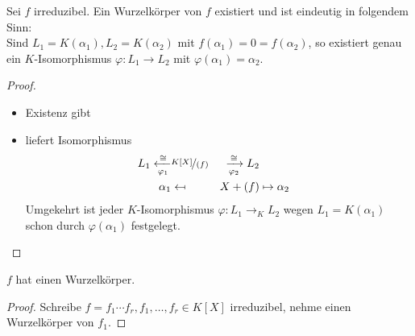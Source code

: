 \begin{proposition}
	Sei $f$ irreduzibel. Ein Wurzelkörper von $f$ existiert und ist eindeutig in folgendem Sinn:\\
	Sind $L_1 = K(\alpha_1), L_2 = K(\alpha_2)$ mit $f(\alpha_1) = 0 = f(\alpha_2)$, so existiert genau ein $K$-Isomorphismus $\varphi: L_1 \to L_2$ mit $\varphi(\alpha_1) = \alpha_2$.
\end{proposition}
\begin{proof}
	\begin{itemize}
		\item Existenz gibt 
		\item {} liefert Isomorphismus
		\begin{align*}
			L_1 \xleftarrow[\varphi_1]{\cong} & \lnkset{K[X]}{(f)} & \xrightarrow[\varphi_2]{\cong} L_2\\
			\alpha_1 & \mapsfrom 
			& X + (f) & \mapsto \alpha_2\\
		\end{align*}
		Umgekehrt ist jeder $K$-Isomorphismus $\varphi: L_1 \to_K L_2$ wegen $L_1 = K(\alpha_1)$ schon durch $\varphi(\alpha_1)$ festgelegt.
	\end{itemize}
\end{proof}
\begin{conclusion}
	$f$ hat einen Wurzelkörper.
\end{conclusion}
\begin{proof}
	Schreibe $f=f_1\cdots f_r, f_1,\dots,f_r \in K[X]$ irreduzibel, nehme einen Wurzelkörper von $f_1$.
\end{proof}

